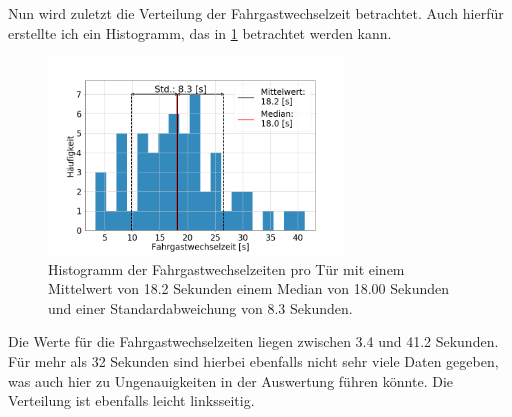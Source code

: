 Nun wird zuletzt die Verteilung der Fahrgastwechselzeit betrachtet. Auch hierfür erstellte ich ein Histogramm, das in \figurename \ref{fig:histAllTimes} betrachtet werden kann.
\begin{figure}[H]
	\centering
	\includegraphics[width=0.7\textwidth]{pictures/data_evaluation/transferTime/hist_transfer_times.png}
	\caption{Histogramm der Fahrgastwechselzeiten pro Tür mit einem Mittelwert von 18.2 Sekunden einem Median von 18.00 Sekunden und einer Standardabweichung von 8.3 Sekunden.}
	\label{fig:histAllTimes}
\end{figure}
Die Werte für die Fahrgastwechselzeiten liegen zwischen 3.4 und 41.2 Sekunden. Für mehr als 32 Sekunden sind hierbei ebenfalls nicht sehr viele Daten gegeben, was auch hier zu Ungenauigkeiten in der Auswertung führen könnte. Die Verteilung ist ebenfalls leicht linksseitig.

